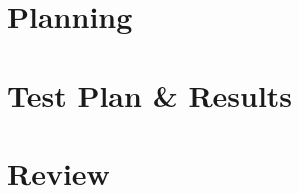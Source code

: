 \documentclass[12pt]{article}
\begin{document}

\section{Planning}                          



\section{Test Plan \& Results}             



\section{Review}                           

\end{document}
